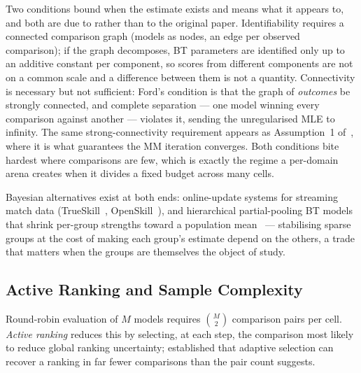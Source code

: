 Two conditions bound when the estimate exists and means what it
appears to, and both are due to \textcite{ford1957ranking} rather
than to the original paper. Identifiability requires a connected
comparison graph (models as nodes, an edge per observed comparison);
if the graph decomposes, BT parameters are identified only up to an
additive constant per component, so scores from different components
are not on a common scale and a difference between them is not a
quantity. Connectivity is necessary but not sufficient: Ford's
condition is that the graph of \emph{outcomes} be strongly connected,
and complete separation --- one model winning every comparison against
another --- violates it, sending the unregularised MLE to infinity.
The same strong-connectivity requirement appears as Assumption~1
of~\textcite{hunter2004mm}, where it is what guarantees the MM
iteration converges. Both conditions bite hardest where
comparisons are few, which is exactly the regime a per-domain arena
creates when it divides a fixed budget across many cells.

Bayesian alternatives exist at both ends: online-update systems for
streaming match data (TrueSkill~\parencite{herbrich2007trueskill},
OpenSkill~\parencite{weng2011bayesian}), and hierarchical
partial-pooling BT models that shrink per-group strengths toward a
population mean~\parencite{cattelan2012paired} --- stabilising
sparse groups at the cost of making each group's estimate depend on
the others, a trade that matters when the groups are themselves the
object of study.

\subsection*{Active Ranking and Sample Complexity}

Round-robin evaluation of $M$ models requires $\binom{M}{2}$
comparison pairs per cell. \textit{Active ranking} reduces this by
selecting, at each step, the comparison most likely to reduce global
ranking uncertainty; \textcite{jamieson2011activeranking} established
that adaptive selection can recover a ranking in far fewer
comparisons than the pair count suggests.

